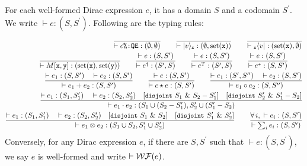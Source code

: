 \begin{definition}[type]
	For each well-formed Dirac expression $e$, it has a domain $S$ and a codomain $S^\prime$. We write $\vdash e : (S,S^\prime)$. Following are the typing rules:
	\begin{align*}
		\frac{}{\vdash c\CtoQE : (\emptyset, \emptyset)} \qquad
		\frac{}{\vdash |v\>_\mx : (\emptyset, \pset{\mx})} \qquad
		\frac{}{\vdash {}_\mx\<v| : (\pset{\mx},\emptyset)} \\
		\frac{}{\vdash M[\mx,\my] : (\pset{\mx}, \pset{\my})} \qquad
		\frac{\vdash e : (S,S^\prime)}{\vdash e^\dag : (S^\prime, S)} \qquad
		\frac{\vdash e : (S,S^\prime)}{\vdash e^T : (S^\prime, S)} \qquad
		\frac{\vdash e : (S,S^\prime)}{\vdash e^\ast : (S, S^\prime)} \qquad \\
		\frac{\vdash e_1 : (S,S^\prime)\quad\vdash e_2 : (S,S^\prime)}{\vdash e_1+e_2 : (S,S^\prime)}\qquad
		\frac{\vdash e : (S,S^\prime)}{\vdash c\star e : (S,S^\prime)}\qquad
		\frac{\vdash e_1 : (S^\prime,S^{\prime\prime})\quad\vdash e_2 : (S,S^\prime)}{\vdash e_1\circ e_2 : (S,S^{\prime\prime})}\\
		\frac{\vdash e_1 : (S_1,S_1^{\prime})\quad\vdash e_2 : (S_2,S_2^{\prime})\quad [\coqm{disjoint}\ S_1\ \&\ S_2-S_1^\prime] \quad [\coqm{disjoint}\ S_2^\prime\ \&\ S_1^\prime-S_2]}{\vdash e_1\cdot e_2 : (S_1\cup(S_2-S_1^\prime), S_2^\prime\cup(S_1^\prime-S_2)}\\
		\frac{\vdash e_1 : (S_1,S_1^{\prime})\quad\vdash e_2 : (S_2,S_2^{\prime})\quad [\coqm{disjoint}\ S_1\ \&\ S_2] \quad [\coqm{disjoint}\ S_1^\prime\ \&\ S_2^\prime]}{\vdash e_1\otimes e_2 : (S_1\cup S_2, S_1^\prime\cup S_2^\prime)}\qquad
		\frac{\forall\,i,\ \vdash e_i: (S,S^\prime)}{\vdash\sum_ie_i:(S,S^\prime)}
	\end{align*}
	Conversely, for any Dirac expression $e$, if there are $S, S^\prime$ such that $\vdash e : (S,S^\prime)$, we say $e$ is well-formed and write $\vdash {\mathcal{WF}}(e)$.
\end{definition}

